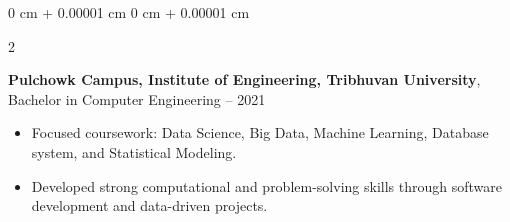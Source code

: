 \documentclass[10pt, letterpaper]{article}
\newenvironment{highlights}{
    \begin{itemize}[
        topsep=0.10 cm,
        parsep=0.10 cm,
        partopsep=0pt,
        itemsep=0.05cm,
        leftmargin=0 cm + 10pt
    ]
}{
    \end{itemize}
} %
\newenvironment{onecolentry}{
    \begin{adjustwidth}{
        0 cm + 0.00001 cm
    }{
        0 cm + 0.00001 cm
    }
}{
    \end{adjustwidth}
} %
\newenvironment{twocolentry}[2][]{
    \onecolentry
    \def\secondColumn{#2}
    \setcolumnwidth{\fill, 4.5 cm}
    \begin{paracol}{2}
}{
    \switchcolumn \raggedleft \secondColumn
    \end{paracol}
    \endonecolentry
} %
\begin{document}
        \vspace{0.10 cm}
        \begin{twocolentry}{
            2016 – 2021
        }
            \textbf{Pulchowk Campus, Institute of Engineering, Tribhuvan University}, \\
            Bachelor in Computer Engineering\end{twocolentry}
            \begin{highlights}
                 \item Focused coursework: Data Science, Big Data, Machine Learning, Database system, and Statistical Modeling.
                \item Developed strong computational and problem-solving skills through software development and data-driven projects.
            \end{highlights}
               
        \vspace{0.10 cm}

    
    
\end{document}
